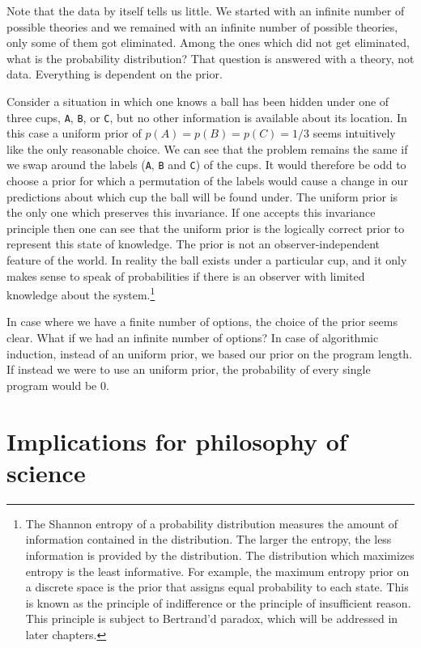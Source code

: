 Note that the data by itself tells us little.
We started with an infinite number of possible theories and we remained with an infinite number of possible theories, only some of them got eliminated.
Among the ones which did not get eliminated, what is the probability distribution?
That question is answered with a theory, not data.
Everything is dependent on the prior.

Consider a situation in which one knows a ball has been hidden under one of three cups, \texttt{A}, \texttt{B}, or \texttt{C}, but no other information is available about its location. 
In this case a uniform prior of $p(A) = p(B) = p(C) = 1/3$ seems intuitively like the only reasonable choice. 
We can see that the problem remains the same if we swap around the labels (\texttt{A}, \texttt{B} and \texttt{C}) of the cups. 
It would therefore be odd to choose a prior for which a permutation of the labels would cause a change in our predictions about which cup the ball will be found under.
The uniform prior is the only one which preserves this invariance. 
If one accepts this invariance principle then one can see that the uniform prior is the logically correct prior to represent this state of knowledge. 
The prior is not an observer-independent feature of the world.
In reality the ball exists under a particular cup, and it only makes sense to speak of probabilities if there is an observer with limited knowledge about the system.\footnote{
The Shannon entropy of a probability distribution measures the amount of information contained in the distribution.
The larger the entropy, the less information is provided by the distribution. 
The distribution which maximizes entropy is the least informative.
For example, the maximum entropy prior on a discrete space is the prior that assigns equal probability to each state.
This is known as the principle of indifference or the principle of insufficient reason.
This principle is subject to Bertrand'd paradox, which will be addressed in later chapters.
}

In case where we have a finite number of options, the choice of the prior seems clear.
What if we had an infinite number of options?
In case of algorithmic induction, instead of an uniform prior, we based our prior on the program length.
If instead we were to use an uniform prior, the probability of every single program would be 0.

\newpage

\section{Implications for philosophy of science}

